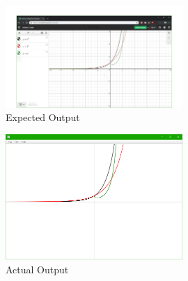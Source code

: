 \documentclass[../../../main.tex]{subfiles}
\begin{document}
\begin{figure}[H]
	\centering
	\includegraphics[width=0.6\textwidth]{tests/expected6}
	\caption{Expected Output}
\end{figure}

\begin{figure}[H]
	\centering
	\includegraphics[width=0.6\textwidth]{tests/actual6}
	\caption{Actual Output}
\end{figure}
\newpage

\newpage
\end{document}
